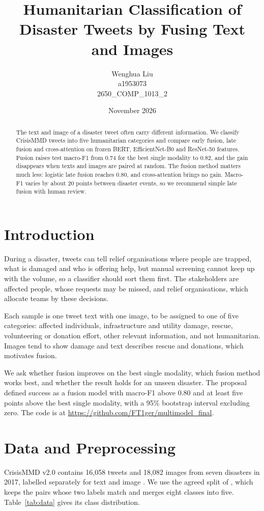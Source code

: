 \documentclass[11pt,a4paper]{article}
\title{Humanitarian Classification of Disaster Tweets by Fusing Text and Images}
\author{Wenghua Liu \\[0.5em] a1953073 \\[0.5em] 2650\_COMP\_1013\_2}
\date{November 2026}
\begin{document}
\maketitle

\begin{abstract}
The text and image of a disaster tweet often carry different information. We classify
CrisisMMD tweets into five humanitarian categories and compare early
fusion, late fusion and cross-attention on frozen BERT, EfficientNet-B0
and ResNet-50 features. Fusion raises test macro-F1 from 0.74 for the best
single modality to 0.82, and the gain disappears when texts and images
are paired at random. The fusion method matters much less: logistic late
fusion reaches 0.80, and cross-attention brings
no gain. Macro-F1 varies by about 20 points between disaster events, so
we recommend simple late fusion with human review.
\end{abstract}

\section{Introduction}
\label{sec:intro}
During a disaster, tweets can tell relief organisations where people are
trapped, what is damaged and who is offering help, but manual screening cannot keep up with the volume, so a classifier should sort them first. The stakeholders are affected people,
whose requests may be missed, and relief organisations, which allocate teams by these decisions.

Each sample is one tweet text with one image, to be assigned to one of
five categories: affected individuals, infrastructure and utility damage,
rescue, volunteering or donation effort, other relevant information, and
not humanitarian. Images tend to show damage and text describes rescue and donations, which motivates fusion.

We ask whether fusion improves on the best single modality, which fusion
method works best, and whether the result holds for an unseen disaster.
The proposal defined success as a fusion model with macro-F1 above 0.80 and at least five points above the best single modality, with a 95\% bootstrap interval excluding zero. The code is at
\url{https://github.com/FT1ger/multimodel_final}.

\section{Data and Preprocessing}
\label{sec:data}
CrisisMMD v2.0 contains 16,058 tweets and 18,082 images from seven
disasters in 2017, labelled separately for text and image
\citep{Alam2018}. We use the agreed split of \citet{Ofli2020}, which keeps
the pairs whose two labels match and merges eight classes into five.
Table~\ref{tab:data} gives its class distribution.
\end{document}
